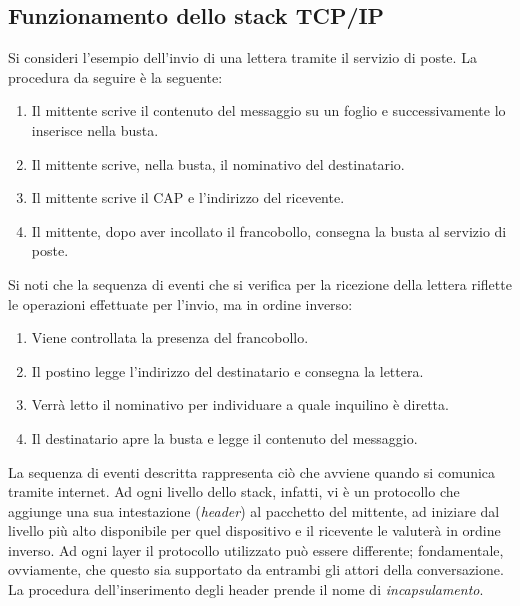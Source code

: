 \subsection{Funzionamento dello stack TCP/IP}
Si consideri l'esempio dell'invio di una lettera tramite il servizio di poste. La procedura da seguire è la seguente:

\begin{enumerate}
	\item Il mittente scrive il contenuto del messaggio su un foglio e successivamente lo inserisce nella busta.
	\item Il mittente scrive, nella busta, il nominativo del destinatario.
	\item Il mittente scrive il CAP e l'indirizzo del ricevente.
	\item Il mittente, dopo aver incollato il francobollo, consegna la busta al servizio di poste.
\end{enumerate}

Si noti che la sequenza di eventi che si verifica per la ricezione della lettera riflette le operazioni effettuate per l'invio, ma in ordine inverso:
\begin{enumerate}
	\item Viene controllata la presenza del francobollo.
	\item Il postino legge l'indirizzo del destinatario e consegna la lettera.
	\item Verrà letto il nominativo per individuare a quale inquilino è diretta.
	\item Il destinatario apre la busta e legge il contenuto del messaggio.
\end{enumerate}

La sequenza di eventi descritta rappresenta ciò che avviene quando si comunica tramite internet. Ad ogni livello dello stack, infatti, vi è un protocollo che aggiunge una sua intestazione (\textit{header}) al pacchetto del mittente, ad iniziare dal livello più alto disponibile per quel dispositivo e il ricevente le valuterà in ordine inverso. Ad ogni layer il protocollo utilizzato può essere differente; fondamentale, ovviamente, che questo sia supportato da entrambi gli attori della conversazione.\\
La procedura dell'inserimento degli header prende il nome di \textit{incapsulamento}.
\\

